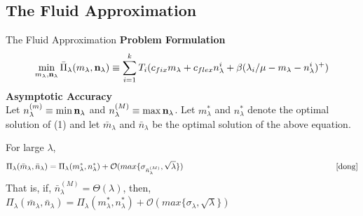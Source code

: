\documentclass[8pt]{beamer}
\begin{document}
\subsection{The Fluid Approximation}
\begin{frame}{The Fluid Approximation}
\textbf{Problem Formulation}\\ 
\[\min_{m_{\lambda},\bold{n}_{\lambda}} \bar{\Pi}_{\lambda}(m_{\lambda},\bold{n}_{\lambda}) \equiv \sum_{i=1}^{k} T_i(c_{fix}m_{\lambda} + c_{flex}n_{\lambda}^i + \beta(\lambda_i/\mu - m_{\lambda} - n_{\lambda}^i)^+)\]
\medskip \textbf{Asymptotic Accuracy} \\
Let $n_{\lambda}^{(m)} \equiv \min \bold{n}_{\lambda}$ and $n_{\lambda}^{(M)} \equiv \max \bold{n}_{\lambda}$. Let $m_{\lambda}^*$ and $n_{\lambda}^*$ denote the optimal solution of (1) and let $\bar{m}_{\lambda}$ and $\bar{n}_{\lambda}$ be the optimal solution of the above equation. 

\begin{theorem}
For large $\lambda$, 
\[ \Pi_{\lambda}(\bar{m}_{\lambda},\bar{n}_{\lambda}) = \Pi_{\lambda}(m_{\lambda}^*,n_{\lambda}^*) + \mathcal{O}(max\{\sigma_{\bar{n}_{\lambda}^{(M)}}, \sqrt{\lambda}\}) \hspace{6.5cm}  \cite{dong}\]
That is, if,  $\bar{n}_{\lambda}^{(M)}=\Theta(\lambda)$, then, $\Pi_{\lambda}(\bar{m}_{\lambda},\bar{n}_{\lambda}) = \Pi_{\lambda}(m_{\lambda}^*,n_{\lambda}^*) + \mathcal{O}(max\{\sigma_{\lambda}, \sqrt{\lambda}\})$ 
\end{theorem}
\end{frame}
\end{document}
